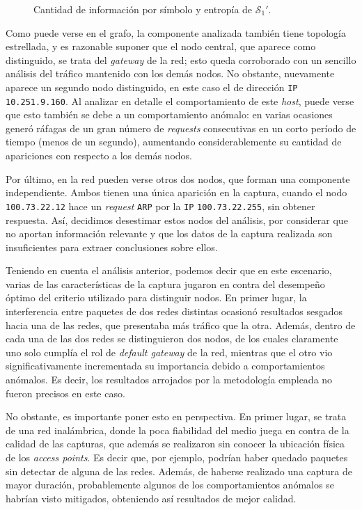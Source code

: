 \begin{figure}[H]
    \caption{Cantidad de información por símbolo y entropía de $\mathcal{S}_1'$.}
    \label{res:esc3:s1prime}
\end{figure}

Como puede verse en el grafo, la componente analizada también tiene topología
estrellada, y es razonable suponer que el nodo central, que aparece como
distinguido, se trata del \emph{gateway} de la red; esto queda corroborado con
un sencillo análisis del tráfico mantenido con los demás nodos. No obstante,
nuevamente aparece un segundo nodo distinguido, en este caso el de dirección
\texttt{IP} \texttt{10.251.9.160}. Al analizar en detalle el comportamiento de
este \emph{host}, puede verse que esto también se debe a un comportamiento
anómalo: en varias ocasiones generó ráfagas de un gran número de
\emph{requests} consecutivas en un corto período de tiempo (menos de un
segundo), aumentando considerablemente su cantidad de apariciones con respecto
a los demás nodos.

Por último, en la red pueden verse otros dos nodos, que forman una componente
independiente. Ambos tienen una única aparición en la captura, cuando el
nodo \texttt{100.73.22.12} hace un \emph{request} \texttt{ARP} por la
\texttt{IP} \texttt{100.73.22.255}, sin obtener respuesta. Así, decidimos
desestimar estos nodos del análisis, por considerar que no aportan información
relevante y que los datos de la captura realizada son insuficientes para
extraer conclusiones sobre ellos.

Teniendo en cuenta el análisis anterior, podemos decir que en este escenario,
varias de las características de la captura jugaron en contra del desempeño
óptimo del criterio utilizado para distinguir nodos. En primer lugar, la
interferencia entre paquetes de dos redes distintas ocasionó resultados
sesgados hacia una de las redes, que presentaba más tráfico que la otra.
Además, dentro de cada una de las dos redes se distinguieron dos nodos, de
los cuales claramente uno solo cumplía el rol de \emph{default gateway} de
la red, mientras que el otro vio significativamente incrementada su
importancia debido a comportamientos anómalos. Es decir, los resultados
arrojados por la metodología empleada no fueron precisos en este caso.

No obstante, es importante poner esto en perspectiva. En primer lugar, se
trata de una red inalámbrica, donde la poca fiabilidad del medio juega en
contra de la calidad de las capturas, que además se realizaron sin conocer la
ubicación física de los \emph{access points}. Es decir que, por ejemplo,
podrían haber quedado paquetes sin detectar de alguna de las redes. Además, de
haberse realizado una captura de mayor duración, probablemente algunos de los
comportamientos anómalos se habrían visto mitigados, obteniendo así resultados
de mejor calidad.
